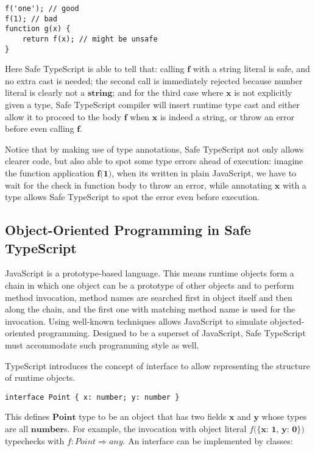 \begin{verbatim}
f('one'); // good
f(1); // bad
function g(x) {
    return f(x); // might be unsafe
}
\end{verbatim}

Here Safe TypeScript is able to tell that: calling $\textbf{f}$ with a string literal
is safe, and no extra cast is needed; the second call is immediately rejected
because number literal is clearly not a $\textbf{string}$;
and for the third case where $\textbf{x}$
is not explicitly given a type, Safe TypeScript compiler will insert runtime type cast
and either allow it to proceed to the body $\textbf{f}$ when $\textbf{x}$ is indeed a string,
or throw an error before even calling $\textbf{f}$.

Notice that by making use of type annotations, Safe TypeScript not only allows
clearer code, but also able to spot some type errors ahead of execution:
imagine the function application $\textbf{f(1)}$, when its written in plain JavaScript,
we have to wait for the check in function body to throw an error,
while annotating $\textbf{x}$ with a type allows Safe TypeScript
to spot the error even before execution.

\subsection{Object-Oriented Programming in Safe TypeScript}

JavaScript is a prototype-based language.
This means runtime objects form a chain in which one object
can be a prototype of other objects and
to perform method invocation, method names are searched
first in object itself and then along the chain,
and the first one with matching method name is used for the invocation.
Using well-known techniques allows JavaScript to simulate objected-oriented programming.
Designed to be a superset of JavaScript, Safe TypeScript must accommodate such programming
style as well.

TypeScript introduces the concept of interface to allow representing the structure
of runtime objects.

\begin{verbatim}
interface Point { x: number; y: number }
\end{verbatim}

This defines $\textbf{Point}$ type to be an object that has two fields $\textbf{x}$
and $\textbf{y}$ whose types are all $\textbf{number}$s.
For example, the invocation with object literal $f(\textbf{\{x: 1, y: 0\})}$ typechecks
with $f : Point \Rightarrow any$.
An interface can be implemented by classes:

